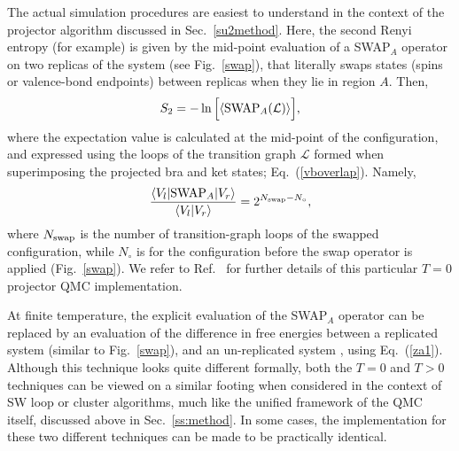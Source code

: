 \documentclass[10pt,pre,aps,twocolumn,showpacs,subscriptaddresses,floatfix]{revtex4}
\begin{document}
The actual simulation procedures are easiest to understand in the context of the projector algorithm discussed in Sec.~\ref{su2method}.  Here, the second Renyi 
entropy (for example) is given by the  mid-point evaluation of a SWAP$_A$ operator on two replicas of the system (see Fig.~\ref{swap}), that literally swaps states 
(spins or valence-bond endpoints) between replicas when they lie in region $A$.  Then,
\begin{equation}
 S_2 = -\ln \Big[ \langle {\rm SWAP}_A (\mathcal{L})  \rangle \Big],
\end{equation}
where the expectation value is calculated at the mid-point of the configuration, and expressed using the loops of the transition graph  $\mathcal{L}$ formed when 
superimposing the projected bra and ket states; Eq.~(\ref{vboverlap}).  Namely,
\begin{equation}
\frac{\langle V_l| {\rm SWAP}_A | V_r\rangle}{\langle V_l| V_r\rangle} = 2^{N_{\rm swap} - N_\circ } ,
\end{equation} 
where $N_{\rm swap}$ is the number of transition-graph loops of the swapped configuration, while $N_\circ$ is for the configuration before the swap 
operator is applied (Fig.~\ref{swap}). We refer to Ref.~\cite{Kallin11} for further details of this particular $T=0$ projector QMC implementation.  

At finite temperature, the explicit evaluation 
of the SWAP$_A$ operator can be replaced by an evaluation of the difference in free energies between a replicated system (similar to Fig.~\ref{swap}), 
and an un-replicated system \cite{Melko10}, using Eq.~(\ref{za1}).  Although this technique looks quite different formally, both the $T=0$ and $T>0$ techniques 
can be viewed on a similar footing when considered in the context of SW loop or cluster algorithms, much like the unified framework of the QMC itself, discussed
above in Sec.~\ref{ss:method}. In some cases, the implementation for these two different techniques can be made to be practically identical.  
\end{document}
